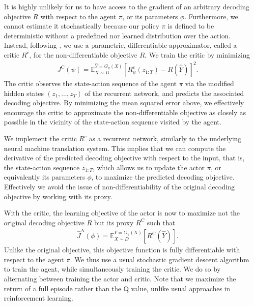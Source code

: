 It is highly unlikely for us to have access to the gradient of an arbitrary decoding objective $R$ with respect to the agent $\pi$, or its parameters $\phi$. Furthermore, we cannot estimate it stochastically because our policy $\pi$ is defined to be deterministic without a predefined nor learned distribution over the action. Instead, following \citep{silver2014deterministic,lillicrap2015continuous}, we use a parametric, differentiable approximator, called a critic $R^c$, for the non-differentiable objective $R$. We train the critic by minimizing
\begin{align*}
J^{\text{C}}(\psi) = \mathbb{E}_{X \sim D}^{\hat{Y}=G_{\pi}(X)}\left[R^c_{\psi}(z_{1:T}) - R(\hat{Y})\right]^2.
\end{align*}
The critic observes the state-action sequence of the agent $\pi$ via the modified hidden states $(z_1, \ldots, z_T)$ of the recurrent network, and predicts the associated decoding objective. By minimizing the mean squared error above, we effectively encourage the critic to approximate the non-differentiable objective as closely as possible in the vicinity of the state-action sequence visited by the agent. 

We implement the critic $R^c$ as a recurrent network, similarly to the underlying neural machine translation system. This implies that we can compute the derivative of the predicted decoding objective with respect to the input, that is, the state-action sequence $z_{1:T}$, which allows us to update the actor $\pi$, or equivalently its parameters $\phi$, to maximize the predicted decoding objective. Effectively we avoid the issue of non-differentiability of the original decoding objective by working with its proxy. 

With the critic, the learning objective of the actor is now to maximize not the original decoding objective $R$ but its proxy $R^{\text{C}}$ such that
\begin{align*}
\hat{J}^{\text{A}}(\phi) = \mathbb{E}_{X \sim D}^{\hat{Y}=G_{\pi}(X)}\left[R^{\text{C}}(\hat{Y})\right].
\end{align*}
Unlike the original objective, this objective function is fully differentiable with respect to the agent $\pi$. We thus use a usual stochastic gradient descent algorithm to train the agent, while simultaneously training the critic. We do so by alternating between training the actor and critic. Note that we maximize the return of a full episode rather than the Q value, unlike usual approaches in reinforcement learning.







